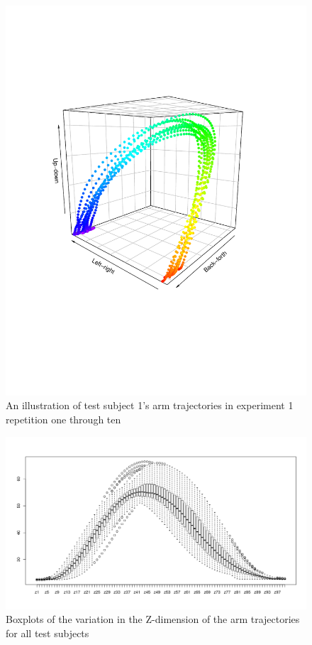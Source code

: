 \documentclass[11pt, fleqn, titlepage]{article}
\begin{document}
\begin{figure}[H]
	\centering
	\includegraphics[scale=0.4]{billeder/Rplot.pdf}
	\caption{An illustration of test subject 1's arm trajectories in experiment 1 repetition one through ten}
	\label{fig:rplot}
\end{figure}


\begin{figure}[H]
	\centering
	\includegraphics[width=0.7\linewidth]{billeder/boxplot_z.pdf}
	\caption{Boxplots of the variation in the Z-dimension of the arm trajectories for all test subjects}
	\label{fig:boxplotz}
\end{figure}
\end{document}

